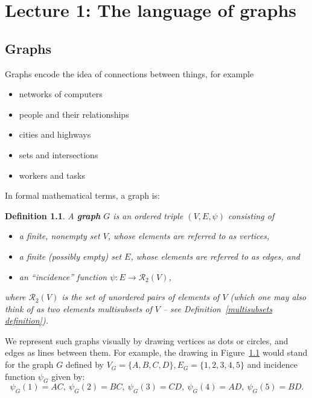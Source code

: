 \documentclass[12pt]{report}
\theoremstyle{plain}
\newtheorem{defn}[thm]{Definition}
\newcommand{\ms}[1]{\mathscr #1}
\newcommand{\Xb}[1]{\textbf{#1}\index{#1}}
\begin{document}
\chapter{Lecture 1: The language of graphs}

\section{Graphs}
Graphs encode the idea of connections between things, for example
\begin{itemize}
\item networks of computers
\item people and their relationships
\item cities and highways
\item sets and intersections
\item workers and tasks
\end{itemize}


In formal mathematical terms, a graph is:
\begin{defn}
A \Xb{graph} $G$ is an ordered triple $(V, E, \psi)$ consisting of
\begin{itemize}
\item a finite, nonempty set $V$, whose elements are referred to as vertices,
\item a finite (possibly empty) set $E$, whose elements are referred to as
edges, and
\item an ``incidence'' function $\psi: E \to \ms R_2(V)$,
\end{itemize}
where $\ms R_2(V)$ is the set of unordered pairs of elements of $V$ (which
one may also think of as two elements multisubsets of $V$ -- see
Definition~\ref{multisubsets definition}).
\end{defn}

We represent such graphs visually by drawing vertices as dots or circles,
and edges as lines between them. For example, the drawing in
Figure~\ref{basic graph} would stand for the graph $G$ defined by $V_G =
\{A, B, C, D\}, E_G = \{1, 2, 3, 4, 5\}$ and incidence function $\psi_G$
given by:
\[\psi_G(1) = AC, \ \psi_G(2) = BC, \ \psi_G(3) = CD, \ \psi_G(4) = AD, \
\psi_G(5) = BD.\]

\begin{figure} \label{basic graph}
\caption{}
\begin{center}
\end{center}
\end{figure}
\end{document}
